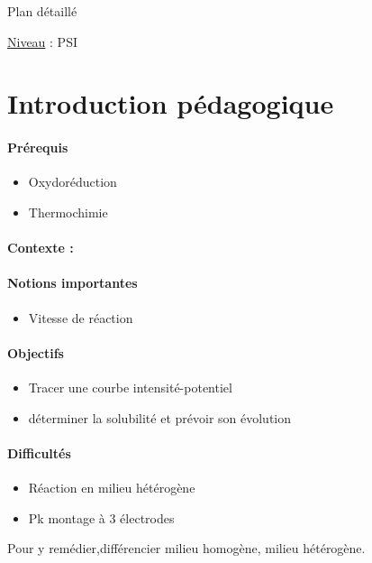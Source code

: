 \begin{reportBlock}{Plan détaillé}

\underline{Niveau} : PSI \\

\section*{Introduction pédagogique}


\paragraph*{Prérequis}
\begin{itemize}
\item Oxydoréduction
\item Thermochimie
\end{itemize}
\paragraph*{Contexte :}


\paragraph*{Notions importantes}

\begin{itemize}
\item Vitesse de réaction
\end{itemize}

\paragraph*{Objectifs}

\begin{itemize}
\item Tracer une courbe intensité-potentiel
\item déterminer la solubilité et prévoir son évolution
\end{itemize}

\paragraph*{Difficultés}

\begin{itemize}
\item Réaction en milieu hétérogène
\item Pk montage à 3 électrodes
\end{itemize}
Pour y remédier,différencier milieu homogène, milieu hétérogène. 

\end{reportBlock}
